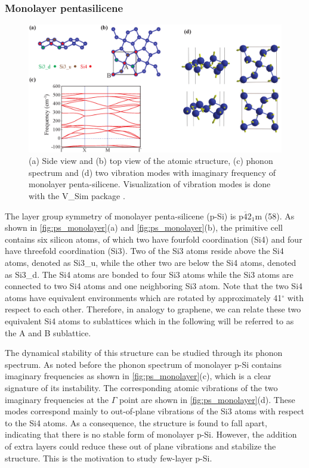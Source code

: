 \subsubsection{Monolayer pentasilicene}\label{mono}

\begin{figure}[htbp]
\centering
\includegraphics[width=\linewidth]{ps_monolayer.eps}%
\caption{(a) Side view and (b) top view of the atomic structure, (c) phonon spectrum and (d) two vibration modes with imaginary frequency of monolayer penta-silicene. Visualization of vibration modes is done with the V\_Sim package \cite{VSim}. \label{fig:ps_monolayer}}
\end{figure}

The layer group symmetry of monolayer penta-silicene (p-Si) is p$\overline{4}$2$_1$m (58). As shown in \autoref{fig:ps_monolayer}(a) and \autoref{fig:ps_monolayer}(b), the primitive cell contains six silicon atoms, of which two have fourfold coordination (Si4) and four have threefold coordination (Si3). Two of the Si3 atoms reside above the Si4 atoms, denoted as Si3\_u, while the other two are below the Si4 atoms, denoted as Si3\_d. The Si4 atoms are bonded to four Si3 atoms while the Si3 atoms are connected to two Si4 atoms and one neighboring Si3 atom. Note that the two Si4 atoms have equivalent environments which are rotated by approximately 41$^{\circ}$ with respect to each other. Therefore, in analogy to graphene, we can relate these two equivalent Si4 atoms to sublattices which in the following will be referred to as the A and B sublattice.

The dynamical stability of this structure can be studied through its phonon spectrum. As noted before\cite{Ding2015,Li2015b} the phonon spectrum of monolayer p-Si contains imaginary frequencies as shown in \autoref{fig:ps_monolayer}(c), which is a clear signature of its instability. The corresponding atomic vibrations of the two imaginary frequencies at the $\Gamma$ point are shown in \autoref{fig:ps_monolayer}(d). These modes correspond mainly to out-of-plane vibrations of the Si3 atoms with respect to the Si4 atoms. As a consequence, the structure is found to fall apart, indicating that there is no stable form of monolayer p-Si. However, the addition of extra layers could reduce these out of plane vibrations and stabilize the structure. This is the motivation to study few-layer p-Si.


